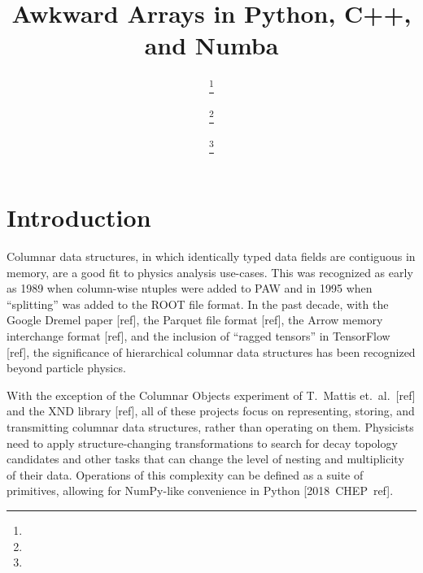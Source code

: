 \documentclass{webofc}
\begin{document}
\title{Awkward Arrays in Python, C++, and Numba}

\author{%
 \fnsep\thanks{} \and
{} \fnsep\thanks{} \and
{} \fnsep\thanks{}}



\maketitle

\section{Introduction}

Columnar data structures, in which identically typed data fields are contiguous in memory, are a good fit to physics analysis use-cases. This was recognized as early as 1989 when column-wise ntuples were added to PAW and in 1995 when ``splitting'' was added to the ROOT file format. In the past decade, with the Google Dremel paper [ref], the Parquet file format [ref], the Arrow memory interchange format [ref], and the inclusion of ``ragged tensors'' in TensorFlow [ref], the significance of hierarchical columnar data structures has been recognized beyond particle physics.

With the exception of the Columnar Objects experiment of T.\ Mattis et.\ al.\ [ref] and the XND library [ref], all of these projects focus on representing, storing, and transmitting columnar data structures, rather than operating on them. Physicists need to apply structure-changing transformations to search for decay topology candidates and other tasks that can change the level of nesting and multiplicity of their data. Operations of this complexity can be defined as a suite of primitives, allowing for NumPy-like convenience in Python \mbox{[2018 CHEP ref].\hspace{-1 cm}}
\end{document}
